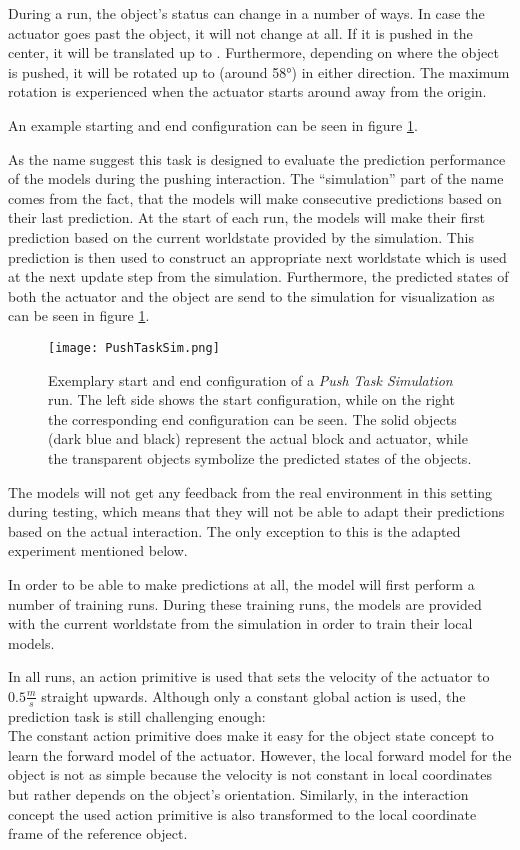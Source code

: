 During a run, the object's status can change in a number of ways. In case the actuator goes past the object, it will not change at all. If it is pushed in the center, it will be translated up to . Furthermore, depending on where the object is pushed, it will be rotated up to  (around 58°) in either direction. %
The maximum rotation is experienced when the actuator starts around  away from the origin.

An example starting and end configuration can be seen in figure \ref{fig:pushTaskSim}. 

As the name suggest this task is designed to evaluate the prediction performance of the models during the pushing interaction. The \enquote{simulation} part of the name comes from the fact, that the models will make consecutive predictions based on their last prediction. At the start of each run, the models will make their first prediction based on the current worldstate provided by the simulation. This prediction is then used to construct an appropriate next worldstate which is used at the next update step from the simulation.
Furthermore, the predicted states of both the actuator and the object are send to the simulation for visualization as can be seen in figure \ref{fig:pushTaskSim}.

\begin{figure}
	\centering
	\texttt{[image: PushTaskSim.png]}
	\caption{Exemplary start and end configuration of a \textit{Push Task Simulation} run. The left side shows the start configuration, while on the right the corresponding end configuration can be seen.
		The solid objects (dark blue and black) represent the actual block and actuator, while the transparent objects symbolize the predicted states of the objects.}
	\label{fig:pushTaskSim}
\end{figure}

The models will not get any feedback from the real environment in this setting during testing, which means that they will not be able to adapt their predictions based on the actual interaction. The only exception to this is the adapted experiment mentioned below.

In order to be able to make predictions at all, the model will first perform a number of training runs. During these training runs, the models are provided with the current worldstate from the simulation in order to train their local models.

In all runs, an action primitive is used that sets the velocity of the actuator to $0.5\frac{m}{s}$ straight upwards. Although only a constant global action is used, the prediction task is still challenging enough: \\
The constant action primitive does make it easy for the object state concept to learn the forward model of the actuator. However, the local forward model for the object is not as simple because the velocity is not constant in local coordinates but rather depends on the object's orientation. 
Similarly, in the interaction concept the used action primitive is also transformed to the local coordinate frame of the reference object.

